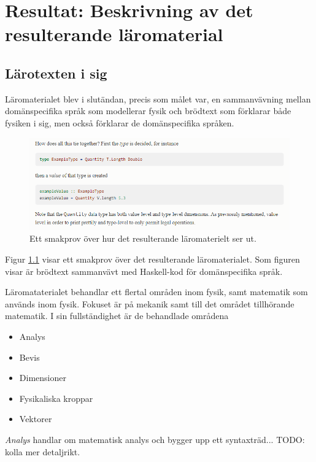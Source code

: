 
\chapter{Resultat: Beskrivning av det resulterande läromaterial}

\begin{binge}

\section{Lärotexten i sig}

Läromaterialet blev i slutändan, precis som målet var, en sammanvävning mellan domänspecifika språk som modellerar fysik och brödtext som förklarar både fysiken i sig, men också förklarar de domänspecifika språken.

\begin{figure}
  \includegraphics[width=\linewidth]{figure/smakprov_laromaterial.png}
  \caption{Ett smakprov över hur det resulterande läromaterielt ser ut.}
  \label{fig:smakprov_laromaterial}
\end{figure}

Figur \ref{fig:smakprov_laromaterial} visar ett smakprov över det resulterande läromaterialet. Som figuren visar är brödtext sammanvävt med Haskell-kod för domänspecifika språk.

Läromataterialet behandlar ett flertal områden inom fysik, samt matematik som används inom fysik. Fokuset är på mekanik samt till det området tillhörande matematik. I sin fullständighet är de behandlade områdena

\begin{itemize}
  \item Analys
  \item Bevis
  \item Dimensioner
  \item Fysikaliska kroppar
  \item Vektorer
\end{itemize}

\textit{Analys} handlar om matematisk analys och bygger upp ett syntaxträd... TODO: kolla mer detaljrikt.


\end{binge}
